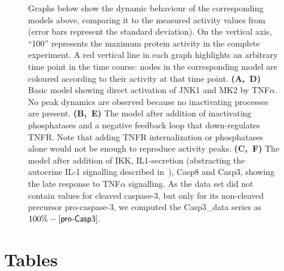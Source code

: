 \documentclass{bmcart}
\begin{document}
\begin{backmatter}
\begin{figure}[!htbp]
\centering
  \caption{
Graphs below show the dynamic behaviour of the corresponding models above, comparing it to the measured
activity values from~\cite{pathway-compendium} (error bars represent the standard deviation).
On the vertical axis, ``100'' represents the maximum protein activity in the complete experiment.
A red vertical line in each graph highlights an arbitrary time point in the time course:
nodes in the corresponding model are coloured according to their activity at that time point.
{\bf(A,~D)}
Basic model showing direct activation of JNK1 and MK2 by TNF$\alpha$.
No peak dynamics are observed because no inactivating processes are present.
{\bf(B,~E)}
The model after addition of inactivating phosphatases and a negative feedback loop that down-regulates TNFR.
Note that adding TNFR internalization or phosphatases alone would not be enough to reproduce activity peaks.
{\bf(C,~F)}
The model after addition of IKK, IL1-secretion (abstracting
the autocrine IL-1 signalling described in~\cite{pathway-autocrine}), Casp8 and Casp3, showing the late response to TNF$\alpha$ signalling.
As the data set did not contain values for cleaved caspase-3, but only for its non-cleaved precursor pro-caspase-3,
we computed the {\sf Casp3\_{}data} series as $100\% - [\mbox{\sf pro-Casp3}]$.\label{fig:small-model}}
\end{figure}








\clearpage
\section*{Tables}



\end{backmatter}
\end{document}
